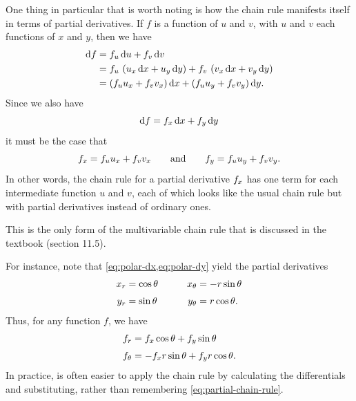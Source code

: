 \documentclass[12pt]{amsart}
\begin{document}
One thing in particular that is worth noting is how the chain rule manifests itself in terms of partial derivatives.
If $f$ is a function of $u$ and $v$, with $u$ and $v$ each functions of $x$ and $y$, then we have
\begin{align*}
  {\ensuremath{\mathrm{d} f}} &= {f}_{u}\,{\mathrm{d} u} + {f}_{v}\,{\mathrm{d} v}\\
  &= {f}_{u}\,\left({u}_{x}\,{\mathrm{d} x} + {u}_{y}\,{\mathrm{d} y}\right) + {f}_{v}\,\left({v}_{x}\,{\mathrm{d} x} + {v}_{y}\,{\mathrm{d} y}\right)\\
  &= \left({f}_{u}{u}_{x}+ {f}_{v}{v}_{x}\right){\mathrm{d} x} + \left({f}_{u}{u}_{y}+ {f}_{v}{v}_{y}\right){\mathrm{d} y}.
\end{align*}
Since we also have
\[ {\mathrm{d} f} = {f}_{x}\,{\mathrm{d} x} + {f}_{y}\,{\mathrm{d} y} \]
it must be the case that
\begin{equation}\label{eq:partial-chain-rule}
  {f}_{x} = {f}_{u}{u}_{x}+ {f}_{v}{v}_{x}
  \qquad\text{and}\qquad
  {f}_{y} = {f}_{u}{u}_{y}+ {f}_{v}{v}_{y}.
\end{equation}
In other words, the chain rule for a partial derivative ${f}_{x}$ has one term for each intermediate function $u$ and $v$, each of which looks like the usual chain rule but with partial derivatives instead of ordinary ones.
\begin{stewart}This is the only form of the multivariable chain rule that is discussed in the textbook (section 11.5).\end{stewart}

For instance, note that \cref{eq:polar-dx,eq:polar-dy} yield the partial derivatives
\begin{alignat*}{2}
  {x}_{r} &= \cos\theta &\qquad
  {x}_{\theta} &= -r\sin\theta\\[3pt]
  {y}_{r} &= \sin\theta &\quad
  {y}_{\theta} &= r\cos\theta.
\end{alignat*}
Thus, for any function $f$, we have
\begin{align*}
  \pder{f}{r} %
  &= \pder{f}{x} \cos\theta + \pder{f}{y} \sin\theta\\[3pt]
  \pder{f}{\theta} %
  &= -\pder{f}{x} r\sin\theta + \pder{f}{y} r \cos \theta.
\end{align*}
In practice, is often easier to apply the chain rule by calculating the differentials and substituting, rather than remembering \cref{eq:partial-chain-rule}.
\end{document}
